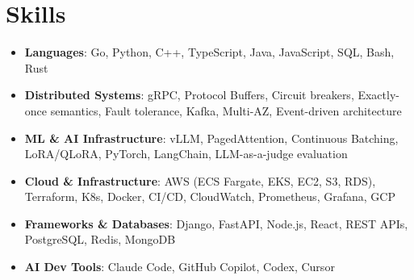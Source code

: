 \documentclass[letterpaper,11pt]{article}
\newcommand{\resumeSubHeadingListStart}{\begin{itemize}[leftmargin=0.15in, label={}]}
\newcommand{\resumeSubHeadingListEnd}{\end{itemize}}
\newcommand{\resumeSkillHeading}[2]{%
  \item\small{\textbf{#1}: #2 \vspace{-9pt}}%
}
\begin{document}
\section{Skills}
  \resumeSubHeadingListStart
    \resumeSkillHeading{Languages}{Go, Python, C++, TypeScript, Java, JavaScript, SQL, Bash, Rust}
    \resumeSkillHeading{Distributed Systems}{gRPC, Protocol Buffers, Circuit breakers, Exactly-once semantics, Fault tolerance, Kafka, Multi-AZ, Event-driven architecture}
    \resumeSkillHeading{ML \& AI Infrastructure}{vLLM, PagedAttention, Continuous Batching, LoRA/QLoRA, PyTorch, LangChain, LLM-as-a-judge evaluation}
    \resumeSkillHeading{Cloud \& Infrastructure}{AWS (ECS Fargate, EKS, EC2, S3, RDS), Terraform, K8s, Docker, CI/CD, CloudWatch, Prometheus, Grafana, GCP}
    \resumeSkillHeading{Frameworks \& Databases}{Django, FastAPI, Node.js, React, REST APIs, PostgreSQL, Redis, MongoDB}
    \resumeSkillHeading{AI Dev Tools}{Claude Code, GitHub Copilot, Codex, Cursor}
  \resumeSubHeadingListEnd
\end{document}
